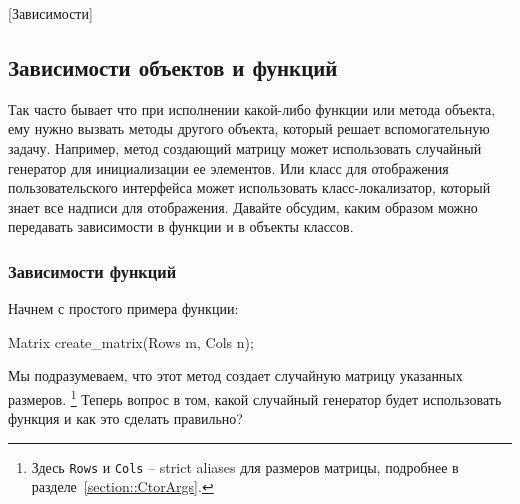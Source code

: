 [Зависимости]


\subsection{Зависимости объектов и функций}

Так часто бывает что при исполнении какой-либо функции или метода объекта, ему нужно вызвать методы другого объекта, который решает вспомогательную задачу.
Например, метод создающий матрицу может использовать случайный генератор для инициализации ее элементов.
Или класс для отображения пользовательского интерфейса может использовать класс-локализатор, который знает все надписи для отображения.
Давайте обсудим, каким образом можно передавать зависимости в функции и в объекты классов.

\subsubsection{Зависимости функций}

Начнем с простого примера функции:
\begin{cppcode}
Matrix create_matrix(Rows m, Cols n);
\end{cppcode}
Мы подразумеваем, что этот метод создает случайную матрицу указанных размеров.%
\footnote{Здесь \verb"Rows" и \verb"Cols" -- strict aliases для размеров матрицы, подробнее в разделе~\ref{section::CtorArgs}.}
Теперь вопрос в том, какой случайный генератор будет использовать функция и как это сделать правильно?


